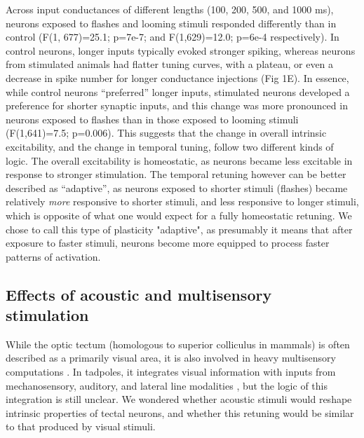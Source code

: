 \documentclass{article}
\begin{document}
Across input conductances of different lengths (100, 200, 500, and 1000 ms), neurons exposed to flashes and looming stimuli responded differently than in control (F(1, 677)=25.1; p=7e-7; and F(1,629)=12.0; p=6e-4 respectively). In control neurons, longer inputs typically evoked stronger spiking, whereas neurons from stimulated animals had flatter tuning curves, with a plateau, or even a decrease in spike number for longer conductance injections (Fig 1E). In essence, while control neurons “preferred” longer inputs, stimulated neurons developed a preference for shorter synaptic inputs, and this change was more pronounced in neurons exposed to flashes than in those exposed to looming stimuli (F(1,641)=7.5; p=0.006). This suggests that the change in overall intrinsic excitability, and the change in temporal tuning, follow two different kinds of logic. The overall excitability is homeostatic, as neurons became less excitable in response to stronger stimulation. The temporal retuning however can be better described as “adaptive”, as neurons exposed to shorter stimuli (flashes) became relatively \textit{more} responsive to shorter stimuli, and less responsive to longer stimuli, which is opposite of what one would expect for a fully homeostatic retuning. We chose to call this type of plasticity "adaptive", as presumably it means that after exposure to faster stimuli, neurons become more equipped to process faster patterns of activation.

\subsection*{Effects of acoustic and multisensory stimulation}

While the optic tectum (homologous to superior colliculus in mammals) is often described as a primarily visual area, it is also involved in heavy multisensory computations \citep{stein2014}. In tadpoles, it integrates visual information with inputs from mechanosensory, auditory, and lateral line modalities \citep{deeg2009,pratt2009,hiramoto2009,felch2016,truszkowski2017}, but the logic of this integration is still unclear. We wondered whether acoustic stimuli would reshape intrinsic properties of tectal neurons, and whether this retuning would be similar to that produced by visual stimuli. 
\end{document}
